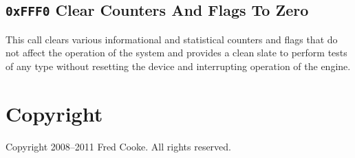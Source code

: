 \documentclass[12pt,a4paper,titlepage]{article}
\begin{document}
\subsection{\texttt{0xFFF0} Clear Counters And Flags To Zero}

This call clears various informational and statistical counters and flags that do not affect the operation of the system and provides a clean slate to perform tests of any type without resetting the device and interrupting operation of the engine.




\newpage
\section{Copyright}

Copyright 2008--2011 Fred Cooke. All rights reserved.
\end{document}
